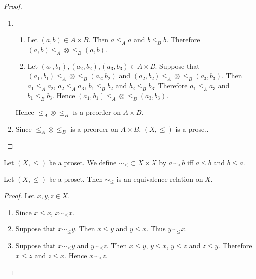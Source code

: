 \documentclass{book}
\begin{document}
	\begin{proof}\
		\begin{enumerate}
			\item 
			\begin{enumerate}
				\item Let $(a, b) \in A \times B$. Then $a \leq_A a$ and $b \leq_B b$. Therefore $(a, b) \leq_A \otimes \leq_B (a ,b)$.
				\item Let $(a_1, b_1), (a_2, b_2), (a_3, b_3) \in A \times B$. Suppose that $(a_1, b_1) \leq_A \otimes \leq_B (a_2, b_2)$ and $(a_2, b_2) \leq_A \otimes \leq_B (a_3, b_3)$. Then $a_1 \leq_A a_2$, $a_2 \leq_A a_3$, $b_1 \leq_B b_2$ and $b_2 \leq_B b_3$. Therefore $a_1 \leq_A a_3$ and $b_1 \leq_B b_3$. Hence $(a_1, b_1) \leq_A \otimes \leq_B (a_3, b_3)$.
			\end{enumerate}
			Hence $\leq_A \otimes \leq_B$ is a preorder on $A \times B$.
			\item Since $\leq_A \otimes \leq_B$ is a preorder on $A \times B$, $(X, \leq)$ is a proset.
		\end{enumerate}
	\end{proof}
	
	\begin{defn} 
		Let $(X, \leq)$ be a proset. We define $\sim_{\leq} \subset X \times X$ by $a \sim_{\leq} b$ iff $a \leq b$ and $b \leq a$.
	\end{defn}
	
	\begin{ex} 
		Let $(X, \leq)$ be a proset. Then $\sim_{\leq}$ is an equivalence relation on $X$.
	\end{ex}
	
	\begin{proof}
		Let $x,y, z \in X$. 
		\begin{enumerate}
			\item Since $x \leq x$, $x \sim_{\leq} x$.
			\item Suppose that $x \sim_{\leq} y$. Then $x \leq y$ and $y \leq x$. Thus $y \sim_{\leq} x$. 
			\item Suppose that $x \sim_{\leq} y$ and $y \sim_{\leq} z$. Then $x \leq y$, $y \leq x$, $y \leq z$ and $z \leq y$. Therefore $x \leq z$ and $z \leq x$. Hence $x \sim_{\leq} z$.  
		\end{enumerate}
	\end{proof}
	
	
	
	
	
	
	
\end{document}
